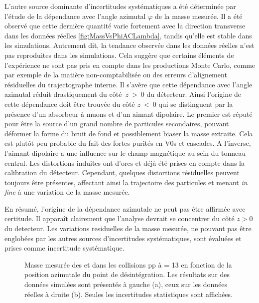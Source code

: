 L'autre source dominante d'incertitudes systématiques a été déterminée par l'étude de la dépendance avec l'angle azimutal $\varphi$ de la masse mesurée. Il a été observé que cette dernière quantité varie fortement avec la direction transverse dans les données réelles  \fig\ref{fig:MassVsPhiACLambda}, tandis qu'elle est stable dans les simulations. Autrement dit, la tendance observée dans les données réelles n'est pas reproduites dans les simulations. Cela suggère que certains éléments de l'expérience ne sont pas pris en compte dans les productions Monte Carlo, comme par exemple de la matière non-comptabilisée ou des erreurs d'alignement résiduelles du trajectographe interne. Il s'avère que cette dépendance avec l'angle azimutal réduit drastiquement du côté~$z~>~0$ du détecteur. Ainsi l'origine de cette dépendance doit être trouvée du côté $z~<~0$ qui se distinguent par la présence d'un absorbeur à muons et d'un aimant dipolaire. Le premier est réputé pour être la source d'un grand nombre de particules secondaires, pouvant déformer la forme du bruit de fond et possiblement biaser la masse extraite. Cela est plutôt peu probable du fait des fortes purités en V0s et cascades. A l'inverse, l'aimant dipolaire a une influence sur le champ magnétique au sein du tonneau central. Les distortions induites ont d'ores et déjà été prises en compte dans la calibration du détecteur. Cependant, quelques distortions résiduelles peuvent toujours être présentes, affectant ainsi la trajectoire des particules et menant \textit{in fine} à une variation de la masse mesurée.

En résumé, l'origine de la dépendance azimutale ne peut pas être affirmée avec certitude. Il apparaît clairement que l'analyse devrait se concentrer du côté $z > 0$ du detecteur. Les variations residuelles de la masse mesurée, ne pouvant pas être englobées par les autres sources d'incertitudes systématiques, sont évaluées et prises comme incertitude systématique.\\

\begin{figure}[!t]
\hspace*{-2.cm}
\caption{Masse mesurée des \rmLambda et \rmAlambda dans les collisions pp à \sqrtS = 13 \tev en fonction de la position azimutale du point de désintégration. Les résultats sur des données simulées sont présentés à gauche (a), ceux sur les données réelles à droite (b). Seules les incertitudes statistiques sont affichées.}
	\label{fig:MassVsACPhi}
\end{figure}


